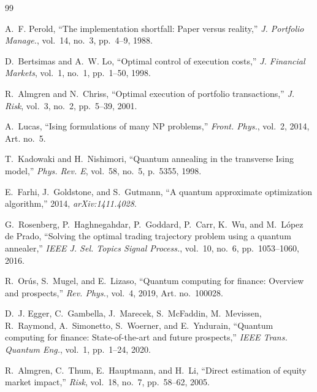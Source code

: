 \documentclass[journal]{IEEEtran}
\begin{document}
\begin{thebibliography}{99}

A.~F. Perold, ``The implementation shortfall: Paper versus reality,'' \emph{J. Portfolio
Manage.}, vol.~14, no.~3, pp.~4--9, 1988.

D.~Bertsimas and A.~W. Lo, ``Optimal control of execution costs,'' \emph{J. Financial
Markets}, vol.~1, no.~1, pp.~1--50, 1998.

R.~Almgren and N.~Chriss, ``Optimal execution of portfolio transactions,'' \emph{J. Risk},
vol.~3, no.~2, pp.~5--39, 2001.

A.~Lucas, ``Ising formulations of many NP problems,'' \emph{Front. Phys.}, vol.~2, 2014, Art. no.~5.

T.~Kadowaki and H.~Nishimori, ``Quantum annealing in the transverse Ising model,''
\emph{Phys. Rev. E}, vol.~58, no.~5, p.~5355, 1998.%

E.~Farhi, J.~Goldstone, and S.~Gutmann, ``A quantum approximate optimization algorithm,''
2014, \emph{arXiv:1411.4028}.

G.~Rosenberg, P.~Haghnegahdar, P.~Goddard, P.~Carr, K.~Wu, and M.~L{\'o}pez de Prado,
``Solving the optimal trading trajectory problem using a quantum annealer,'' \emph{IEEE J.
Sel. Topics Signal Process.}, vol.~10, no.~6, pp.~1053--1060, 2016.

R.~Or{\'u}s, S.~Mugel, and E.~Lizaso, ``Quantum computing for finance: Overview and
prospects,'' \emph{Rev. Phys.}, vol.~4, 2019, Art. no.~100028.

D.~J. Egger, C.~Gambella, J.~Marecek, S.~McFaddin, M.~Mevissen, R.~Raymond, A.~Simonetto,
S.~Woerner, and E.~Yndurain, ``Quantum computing for finance: State-of-the-art and future
prospects,'' \emph{IEEE Trans. Quantum Eng.}, vol.~1, pp.~1--24, 2020.%

R.~Almgren, C.~Thum, E.~Hauptmann, and H.~Li, ``Direct estimation of equity market impact,''
\emph{Risk}, vol.~18, no.~7, pp.~58--62, 2005.


\end{thebibliography}
\end{document}
